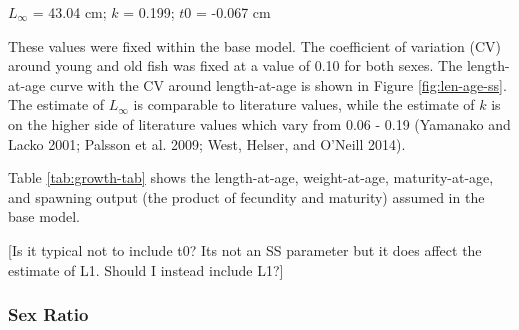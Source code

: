 \documentclass[11pt,
  english,
  a4paper,
]{article}
\begin{document}
\leavevmode\tagmcend\tagstructend\par

\begin{centering}

$L_{\infty}$ = 43.04 cm; $k$ = 0.199; $t0$ = -0.067 cm  

\end{centering}


These values were fixed within the base model. The coefficient of variation (CV) around young and old fish was fixed at a value of 0.10 for both sexes. The length-at-age curve with the CV around length-at-age is shown in Figure \ref{fig:len-age-ss}. The estimate of {\(L_{\infty}\)\leavevmode\tagmcend\tagstructend} is comparable to literature values, while the estimate of {\(k\)\leavevmode\tagmcend\tagstructend} is on the higher side of literature values which vary from 0.06 - 0.19 {(Yamanako and Lacko 2001; Palsson et al. 2009; West, Helser, and O'Neill 2014)\leavevmode\tagmcend\tagstructend}.

\leavevmode\tagmcend\tagstructend\par


Table \ref{tab:growth-tab} shows the length-at-age, weight-at-age, maturity-at-age, and spawning output (the product of fecundity and maturity) assumed in the base model.

\leavevmode\tagmcend\tagstructend\par


{[}Is it typical not to include t0? Its not an SS parameter but it does affect the estimate of L1. Should I instead include L1?{]}

\leavevmode\tagmcend\tagstructend\par


\hypertarget{sex-ratio}{%
\subsubsection{Sex Ratio}\label{sex-ratio}}

\leavevmode\tagmcend\tagstructend
\end{document}

